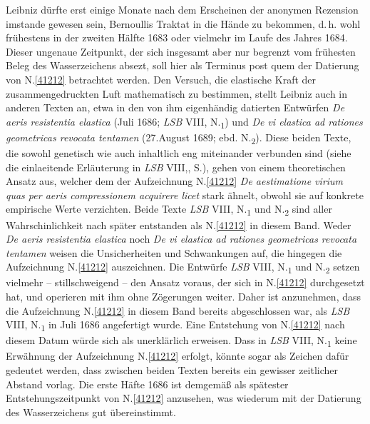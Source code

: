 Leibniz dürfte erst einige Monate nach dem Erscheinen der anonymen Rezension imstande gewesen sein, Bernoullis Traktat in die Hände zu bekommen, d.\,h. wohl frühestens in der zweiten Hälfte 1683 oder vielmehr im Laufe des Jahres 1684.
Dieser ungenaue Zeitpunkt, der sich insgesamt aber nur begrenzt vom frühesten Beleg des Wasserzeichens absezt, soll hier als Terminus post quem der Datierung von N.\;\ref{41212} betrachtet werden.
\pend%
\pstart%
Den Versuch, die elastische Kraft der zusammengedruckten Luft mathematisch zu bestimmen, stellt Leibniz auch in anderen Texten an, etwa in den von ihm eigenhändig datierten Entwürfen \textit{De aeris resistentia elastica} (Juli 1686; \textit{LSB} VIII, N.\textsubscript{1}\cite{02561}) und \textit{De vi elastica ad rationes geometricas revocata tentamen} (27.\;August 1689; ebd. N.\textsubscript{2}\cite{02562}).
Diese beiden Texte, die sowohl genetisch wie auch inhaltlich eng miteinander verbunden sind (siehe die einlaeitende Erläuterung in \textit{LSB} VIII,, S.), gehen von einem theoretischen Ansatz aus, welcher dem der Aufzeichnung N.\;\ref{41212} \textit{De aestimatione virium quas per aeris compressionem acquirere licet} stark ähnelt, obwohl sie auf konkrete empirische Werte verzichten.
Beide Texte \textit{LSB} VIII, N.\textsubscript{1}\cite{02561} und N.\textsubscript{2} sind aller Wahrschinlichkeit nach später entstanden als N.\;\ref{41212} in diesem Band.
Weder \textit{De aeris resistentia elastica} noch \textit{De vi elastica ad rationes geometricas revocata tentamen} weisen die Unsicherheiten und Schwankungen auf, die hingegen die Aufzeichnung N.\;\ref{41212} auszeichnen.
Die Entwürfe \textit{LSB} VIII, N.\textsubscript{1}\cite{02561} und N.\textsubscript{2}\cite{02562} setzen vielmehr -- stillschweigend -- den Ansatz voraus, der sich in N.\;\ref{41212} durchgesetzt hat, und operieren mit ihm ohne Zögerungen weiter.
Daher ist anzunehmen, dass die Aufzeichnung N.\;\ref{41212} in diesem Band bereits abgeschlossen war, als \textit{LSB} VIII, N.\textsubscript{1}\cite{02561} in Juli 1686 angefertigt wurde.
Eine Entstehung von N.\;\ref{41212} nach diesem Datum würde sich als unerklärlich erweisen.
Dass in \textit{LSB} VIII, N.\textsubscript{1}\cite{02561} keine Erwähnung der Aufzeichnung N.\;\ref{41212} erfolgt, könnte sogar als Zeichen dafür gedeutet werden,
\ledpb%
dass zwischen beiden Texten bereits ein gewisser zeitlicher Abstand vorlag.
Die erste Häfte 1686 ist demgemäß als spätester Entstehungszeitpunkt von N.\;\ref{41212} anzusehen, was wiederum mit der Datierung des Wasserzeichens gut übereinstimmt.
